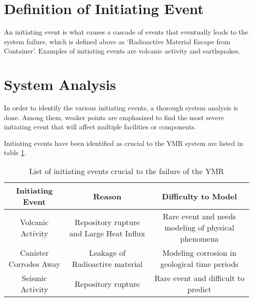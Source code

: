 \documentclass[12pt]{article}
\begin{document}
\section{Definition of Initiating Event}
An initiating event is what causes a cascade of events that eventually leads
to the system failure, which is defined above as `Radioactive Material Escape
from Container'. Examples of initiating events are volcanic activity and 
earthquakes.

\section{System Analysis}
In order to identify the various initiating events, a thorough system analysis
is done. Among them, weaker points are emphasized to find the most severe
initiating event that will affect multiple facilities or components. 

Initiating events have been identified as crucial to the 
\gls{YMR} system are listed in table \ref{tab:ie}.

\begin{table}[h]
    \centering
        \begin{tabular}{ccc}
            \hline
            \textbf{Initiating Event} & \textbf{Reason} & \textbf{Difficulty to Model} \\ \hline
            Volcanic Activity & Repository rupture and Large Heat Influx & Rare event and needs modeling of physical phenomena \\ 
            Canister Corrodes Away & Leakage of Radioactive material & Modeling corrosion in geological time periods \\
            Seismic Activity & Repository rupture & Rare event and difficult to predict \\ \hline
        \end{tabular}
        \caption{List of initiating events crucial to the failure of the \gls{YMR}}
        \label{tab:ie}
\end {table}
\FloatBarrier

\FloatBarrier





\end{document}
